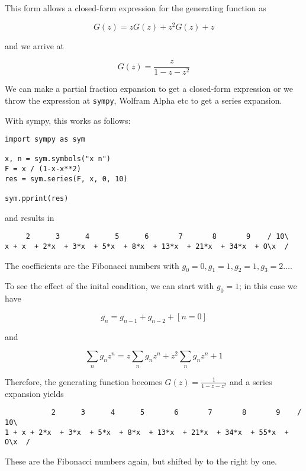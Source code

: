 This form allows a closed-form expression for the generating function as

\[ G(z) = z G(z) + z^2 G(z) + z \]

and we arrive at

\[ G(z) = \frac{z}{1-z-z^2} \]

We can make a partial fraction expansion to get a closed-form expression
or we throw the expression at \texttt{sympy}, Wolfram Alpha etc to get a
series expansion.

With sympy, this works as follows:

\begin{verbatim}
import sympy as sym

x, n = sym.symbols("x n")
F = x / (1-x-x**2)
res = sym.series(F, x, 0, 10)

sym.pprint(res)
\end{verbatim}

and results in

\begin{verbatim}
     2      3      4      5      6       7       8       9    / 10\
x + x  + 2*x  + 3*x  + 5*x  + 8*x  + 13*x  + 21*x  + 34*x  + O\x  /
\end{verbatim}

The coefficients are the Fibonacci numbers with
\(g_0=0, g_1=1, g_2=1, g_3=2 \ldots\).

To see the effect of the inital condition, we can start with \(g_0=1\);
in this case we have

\[ g_n = g_{n-1} + g_{n-2} + [n=0] \]

and

\[ \sum_n g_n z^n = z \sum_n g_{n} z^n + z^2 \sum_n g_{n} z^n + 1 \]

Therefore, the generating function becomes $G(z) = \frac{1}{1-z-z^2}$ and a series expansion yields

\begin{verbatim}
           2      3      4      5       6       7       8       9    / 10\
1 + x + 2*x  + 3*x  + 5*x  + 8*x  + 13*x  + 21*x  + 34*x  + 55*x  + O\x  /
\end{verbatim}

These are the Fibonacci numbers again, but shifted by to the right by one.
